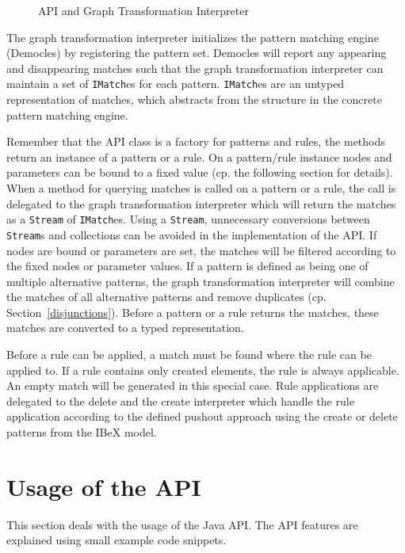 \begin{figure}[h!]
	\centering
	
	\caption{API and Graph Transformation Interpreter}
	\label{fig:api-and-interpreter}
\end{figure}

\noindent
The graph transformation interpreter initializes the pattern matching engine (Democles) by registering the pattern set.
Democles will report any appearing and disappearing matches such that the graph transformation interpreter can maintain a set of \texttt{IMatch}es for each pattern.
\texttt{IMatch}es are an untyped representation of matches, which abstracts from the structure in the concrete pattern matching engine.

Remember that the API class is a factory for patterns and rules, \ie the methods return an instance of a pattern or a rule.
On a pattern/rule instance nodes and parameters can be bound to a fixed value (cp. the following section for details).
When a method for querying matches is called on a pattern or a rule, the call is delegated to the graph transformation interpreter which will return the matches as a \texttt{Stream} of \texttt{IMatch}es.
Using a \texttt{Stream}, unnecessary conversions between \texttt{Stream}s and collections can be avoided in the implementation of the API.
If nodes are bound or parameters are set, the matches will be filtered according to the fixed nodes or parameter values.
If a pattern is defined as being one of multiple alternative patterns, the graph transformation interpreter will combine the matches of all alternative patterns and remove duplicates (cp. Section~\ref{disjunctions}).
Before a pattern or a rule returns the matches, these matches are converted to a typed representation.

Before a rule can be applied, a match must be found where the rule can be applied to.
If a rule contains only created elements, the rule is always applicable. An empty match will be generated in this special case.
Rule applications are delegated to the delete and the create interpreter which handle the rule application according to the defined pushout approach using the create or delete patterns from the IBeX model.

\section{Usage of the API}
\label{api-usage}
This section deals with the usage of the Java API.
The API features are explained using small example code snippets.

